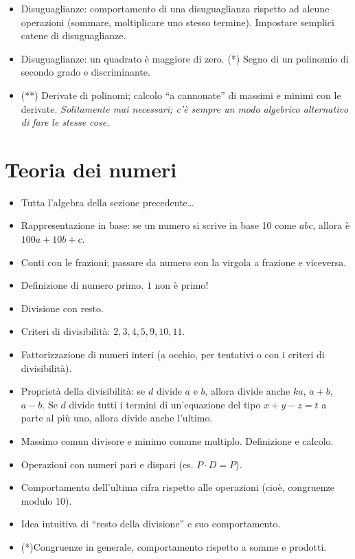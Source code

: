 \documentclass[a4paper,10pt]{paper}
\renewcommand{\star}{(*)}
\newcommand{\sstar}{(**)}
\begin{document}
\begin{itemize}
 \item Disuguaglianze: comportamento di una disuguaglianza rispetto ad alcune operazioni (sommare, moltiplicare uno stesso termine). Impostare semplici catene di disuguaglianze.
 \item Disuguaglianze: un quadrato è maggiore di zero. \star{} Segno di un polinomio di secondo grado e discriminante.
 \item \sstar{} Derivate di polinomi; calcolo ``a cannonate'' di massimi e minimi con le derivate. \emph{Solitamente mai necessari; c'è sempre un modo algebrico alternativo di fare le stesse cose.}
\end{itemize}

\section{Teoria dei numeri}
\begin{itemize}
 \item Tutta l'algebra della sezione precedente\dots
 \item Rappresentazione in base: se un numero si scrive in base 10 come $abc$, allora è $100a+10b+c$.
 \item Conti con le frazioni; passare da numero con la virgola a frazione e viceversa.
 \item Definizione di numero primo. $1$ non è primo!
 \item Divisione con resto.
 \item Criteri di divisibilità: $2,3,4,5,9,10,11$.
 \item Fattorizzazione di numeri interi (a occhio, per tentativi o con i criteri di divisibilità).
 \item Proprietà della divisibilità: se $d$ divide $a$ e $b$, allora divide anche $ka$, $a+b$, $a-b$. Se $d$ divide tutti i termini di un'equazione del tipo $x+y-z=t$ a parte al più uno, allora divide anche l'ultimo.
 \item Massimo comun divisore e minimo comune multiplo. Definizione e calcolo.
 \item Operazioni con numeri pari e dispari (es. $P\cdot D=P$).
 \item Comportamento dell'ultima cifra rispetto alle operazioni (cioè, congruenze modulo 10).
 \item Idea intuitiva di ``resto della divisione'' e suo comportamento.
 \item \star Congruenze in generale, comportamento rispetto a somme e prodotti.
\end{itemize}
\end{document}
